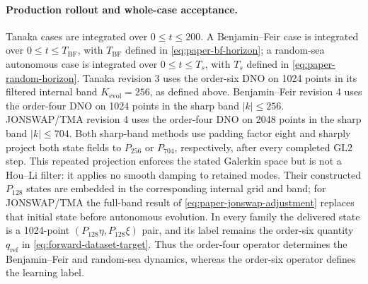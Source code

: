 \paragraph{Production rollout and whole-case acceptance.}
Tanaka cases are integrated over \(0\leq t\leq200\).  A Benjamin--Feir case
is integrated over \(0\leq t\leq T_{\mathrm{BF}}\), with
\(T_{\mathrm{BF}}\) defined in \cref{eq:paper-bf-horizon}; a random-sea
autonomous case is integrated over \(0\leq t\leq T_s\), with \(T_s\) defined
in \cref{eq:paper-random-horizon}.  Tanaka revision 3 uses
the order-six DNO on 1024 points in its filtered internal band
\(K_{\mathrm{evol}}=256\), as defined above.  Benjamin--Feir revision 4 uses
the order-four DNO on 1024 points in the sharp band \(|k|\le256\).
JONSWAP/TMA revision 4 uses the order-four DNO on 2048 points in the sharp
band \(|k|\le704\).  Both sharp-band methods use padding factor eight and
sharply project both state fields to \(P_{256}\) or \(P_{704}\), respectively,
after every completed GL2 step.  This repeated projection enforces the stated
Galerkin space but is not a Hou--Li filter: it applies no smooth damping to
retained modes.  Their constructed \(P_{128}\) states are embedded in the
corresponding internal grid and band; for JONSWAP/TMA the full-band result of
\cref{eq:paper-jonswap-adjustment} replaces that initial state before
autonomous evolution.  In every family the delivered state is a 1024-point
\((P_{128}\eta,P_{128}\xi)\) pair, and its label remains the order-six
quantity \(q_{\mathrm{ref}}\) in \cref{eq:forward-dataset-target}.  Thus the
order-four operator determines the Benjamin--Feir and random-sea
dynamics, whereas the order-six operator defines the learning label.

